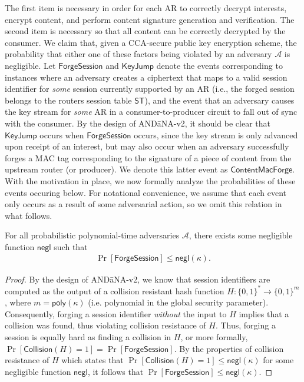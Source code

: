The first item is necessary in order for each AR to correctly decrypt interests, encrypt content, and perform content signature generation and verification. The second item is necessary so that all content can be correctly decrypted by the consumer. We claim that, given a CCA-secure public key encryption scheme, the probability that either one of these factors being violated by an adversary $\mathcal{A}$ is negligible. Let $\mathsf{ForgeSession}$ and $\mathsf{KeyJump}$ denote the events corresponding to instances where an adversary creates a ciphertext that maps to a valid session identifier for \emph{some} session currently supported by an AR (i.e., the forged session belongs to the routers session table $\mathsf{ST}$), and the event that an adversary causes the key stream for \emph{some} AR in a consumer-to-producer circuit to fall out of sync with the consumer. By the design of {\sf AND\=aNA-v2}, it should be clear that $\mathsf{KeyJump}$ occurs when $\mathsf{ForgeSession}$ occurs, since the key stream is only advanced upon receipt of an interest, but may also occur when an adversary successfully forges a MAC tag corresponding to the signature of a piece of content from the upstream router (or producer). We denote this latter event as $\mathsf{ContentMacForge}$. With the motivation in place, we now formally analyze the probabilities of these events occuring below. For notational convenience, we assume that each event only occurs as a result of some adversarial action, so we omit this relation in what follows.

\begin{lemma}
For all probabilistic polynomial-time adversaries $\mathcal{A}$, there exists some negligible function $\mathsf{negl}$ such that
\begin{align*}
\Pr[\mathsf{ForgeSession}] \leq \mathsf{negl}(\kappa).
\end{align*}
\end{lemma}
\begin{proof}
By the design of {\sf AND\=aNA-v2}, we know that session identifiers are computed as the output of a collision resistant hash function $H : \{0,1\}^* \to \{0,1\}^{m}$, where $m = \mathsf{poly}(\kappa)$ (i.e. polynomial in the global security parameter). Consequently, forging a session identifier \emph{without} the input to $H$ implies that a collision was found, thus violating collision resistance of $H$. Thus, forging a session is equally hard as finding a collision in $H$, or more formally, $\Pr[\mathsf{Collision}(H) = 1] = \Pr[\mathsf{ForgeSession}]$. By the properties of collision resistance of $H$ which states that $\Pr[\mathsf{Collision}(H) = 1] \leq \mathsf{negl}(\kappa)$ for some negligible function $\mathsf{negl}$, it follows that $\Pr[\mathsf{ForgeSession}] \leq \mathsf{negl}(\kappa)$. 

\end{proof}

